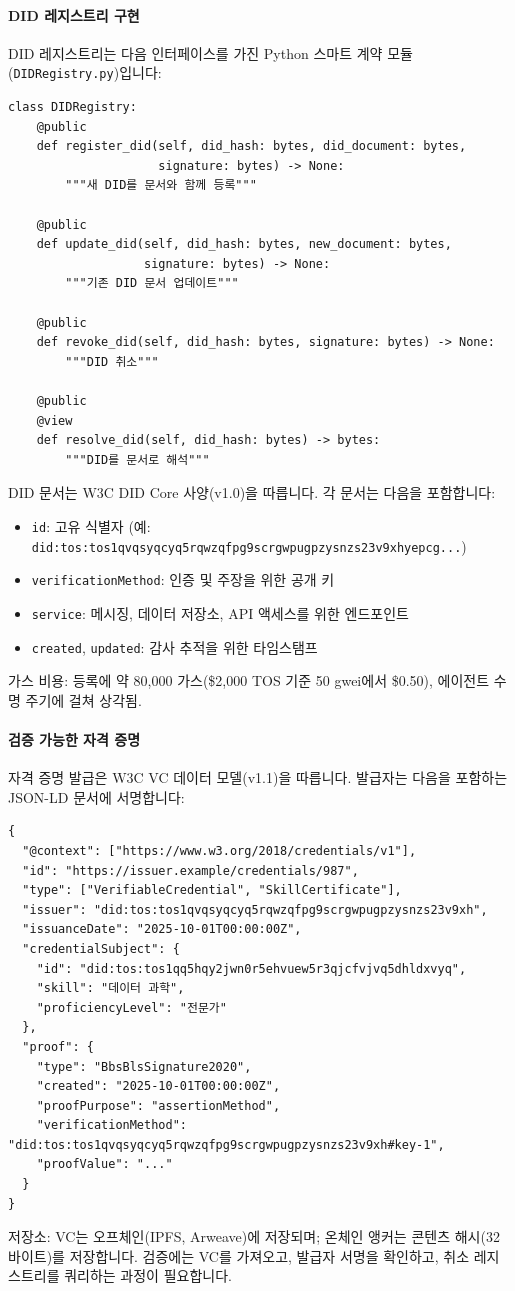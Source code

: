 \documentclass[11pt]{article}
\begin{document}
\paragraph{DID 레지스트리 구현} DID 레지스트리는 다음 인터페이스를 가진 Python 스마트 계약 모듈(\texttt{DIDRegistry.py})입니다:
\begin{verbatim}
class DIDRegistry:
    @public
    def register_did(self, did_hash: bytes, did_document: bytes,
                     signature: bytes) -> None:
        """새 DID를 문서와 함께 등록"""

    @public
    def update_did(self, did_hash: bytes, new_document: bytes,
                   signature: bytes) -> None:
        """기존 DID 문서 업데이트"""

    @public
    def revoke_did(self, did_hash: bytes, signature: bytes) -> None:
        """DID 취소"""

    @public
    @view
    def resolve_did(self, did_hash: bytes) -> bytes:
        """DID를 문서로 해석"""
\end{verbatim}
DID 문서는 W3C DID Core 사양(v1.0)을 따릅니다. 각 문서는 다음을 포함합니다:
\begin{itemize}[noitemsep]
  \item \texttt{id}: 고유 식별자 (예: \texttt{did:tos:tos1qvqsyqcyq5rqwzqfpg9scrgwpugpzysnzs23v9xhyepcg...})
  \item \texttt{verificationMethod}: 인증 및 주장을 위한 공개 키
  \item \texttt{service}: 메시징, 데이터 저장소, API 액세스를 위한 엔드포인트
  \item \texttt{created}, \texttt{updated}: 감사 추적을 위한 타임스탬프
\end{itemize}
가스 비용: 등록에 약 80,000 가스(\$2,000 TOS 기준 50 gwei에서 \$0.50), 에이전트 수명 주기에 걸쳐 상각됨.

\paragraph{검증 가능한 자격 증명} 자격 증명 발급은 W3C VC 데이터 모델(v1.1)을 따릅니다. 발급자는 다음을 포함하는 JSON-LD 문서에 서명합니다:
\begin{verbatim}
{
  "@context": ["https://www.w3.org/2018/credentials/v1"],
  "id": "https://issuer.example/credentials/987",
  "type": ["VerifiableCredential", "SkillCertificate"],
  "issuer": "did:tos:tos1qvqsyqcyq5rqwzqfpg9scrgwpugpzysnzs23v9xh",
  "issuanceDate": "2025-10-01T00:00:00Z",
  "credentialSubject": {
    "id": "did:tos:tos1qq5hqy2jwn0r5ehvuew5r3qjcfvjvq5dhldxvyq",
    "skill": "데이터 과학",
    "proficiencyLevel": "전문가"
  },
  "proof": {
    "type": "BbsBlsSignature2020",
    "created": "2025-10-01T00:00:00Z",
    "proofPurpose": "assertionMethod",
    "verificationMethod": "did:tos:tos1qvqsyqcyq5rqwzqfpg9scrgwpugpzysnzs23v9xh#key-1",
    "proofValue": "..."
  }
}
\end{verbatim}
저장소: VC는 오프체인(IPFS, Arweave)에 저장되며; 온체인 앵커는 콘텐츠 해시(32바이트)를 저장합니다. 검증에는 VC를 가져오고, 발급자 서명을 확인하고, 취소 레지스트리를 쿼리하는 과정이 필요합니다.
\end{document}
